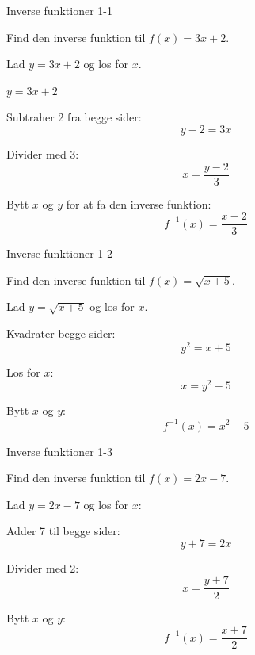 \documentclass{article}
\begin{document}

\tableofcontents
\newpage

\begin{exercise}{Inverse funktioner 1-1}

Find den inverse funktion til $f(x) = 3x + 2$.


\hint

Lad $y = 3x + 2$ og los for $x$.

\hint

$y = 3x + 2$ 

\hint

Subtraher 2 fra begge sider:
\[
y - 2 = 3x
\]

\hint

Divider med 3:
\[
x = \frac{y - 2}{3}
\]

\hint

Bytt $x$ og $y$ for at fa den inverse funktion:
\[
f^{-1}(x) = \frac{x - 2}{3}
\]

\end{exercise}

\newpage

\begin{exercise}{Inverse funktioner 1-2}

Find den inverse funktion til $f(x) = \sqrt{x + 5}$.


\hint

Lad $y = \sqrt{x + 5}$ og los for $x$.

\hint

Kvadrater begge sider:
\[
y^2 = x + 5
\]

\hint

Los for $x$:
\[
x = y^2 - 5
\]

\hint

Bytt $x$ og $y$:
\[
f^{-1}(x) = x^2 - 5
\]

\end{exercise}

\newpage

\begin{exercise}{Inverse funktioner 1-3}

Find den inverse funktion til $f(x) = 2x - 7$.


\hint

Lad $y = 2x - 7$ og los for $x$:

\hint

Adder 7 til begge sider:
\[
y + 7 = 2x
\]

\hint

Divider med 2:
\[
x = \frac{y + 7}{2}
\]

\hint

Bytt $x$ og $y$:
\[
f^{-1}(x) = \frac{x + 7}{2}
\]

\end{exercise}
\end{document}
